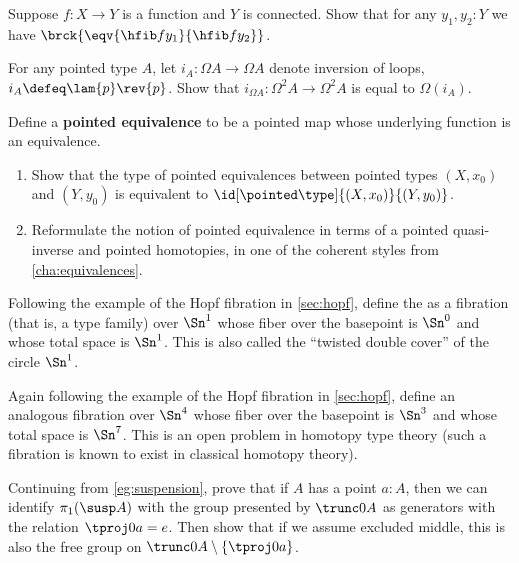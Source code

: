 \begin{ex}\label{ex:unique-fiber}
  Suppose $f:X\to Y$ is a function and $Y$ is connected.
  Show that for any $y_1,y_2:Y$ we have $\brck{\eqv{\hfib f {y_1}}{\hfib f {y_2}}}$.
\end{ex}

\begin{ex}\label{ex:ap-path-inversion}
  For any pointed type $A$, let $i_A : \Omega A \to \Omega A$ denote inversion of loops, $i_A \defeq \lam{p} \rev{p}$.
  Show that $i_{\Omega A} : \Omega^2 A \to \Omega^2 A$ is equal to $\Omega(i_A)$.
\end{ex}

\begin{ex}\label{ex:pointed-equivalences}
  Define a \textbf{pointed equivalence} to be a pointed map whose underlying function is an equivalence.
  \begin{enumerate}
  \item Show that the type of pointed equivalences between pointed types $(X,x_0)$ and $(Y,y_0)$ is equivalent to $\id[\pointed\type]{(X,x_0)}{(Y,y_0)}$.
  \item Reformulate the notion of pointed equivalence in terms of a pointed quasi-inverse and pointed homotopies, in one of the coherent styles from \cref{cha:equivalences}.
  \end{enumerate}
\end{ex}

\begin{ex}\label{ex:HopfJr}
  Following the example of the Hopf fibration in \cref{sec:hopf}, define the 
as a fibration (that is, a type family) over $\Sn ^1$ whose fiber over the basepoint is $\Sn ^0$ and whose total space is $\Sn ^1$.  This is also called the ``twisted double cover'' of the circle $\Sn ^1$.
\end{ex}

\begin{ex}\label{ex:SuperHopf}
Again following the example of the Hopf fibration in \cref{sec:hopf}, define an analogous fibration over $\Sn ^4$ whose fiber over the basepoint is $\Sn ^3$ and whose total space is $\Sn ^7$.  This is an open problem in homotopy type theory (such a fibration is known to exist in classical homotopy theory).
\end{ex}

\begin{ex}\label{ex:vksusppt}
  Continuing from \cref{eg:suspension}, prove that if $A$ has a point $a:A$, then we can identify $\pi_1(\susp A)$ with the group presented by $\trunc0A$ as generators with the relation $\tproj0a = e$.
  Then show that if we assume excluded middle, this is also the free group on $\trunc0 A \setminus \{\tproj0 a \}$.
\end{ex}

